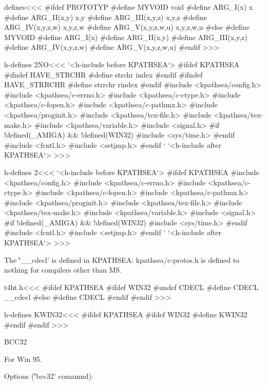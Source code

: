 {\<defines\><<<
#ifdef PROTOTYP
#define MYVOID void
#define ARG_I(x) x
#define ARG_II(x,y) x,y
#define ARG_III(x,y,z) x,y,z
#define ARG_IV(x,y,z,w) x,y,z,w
#define ARG_V(x,y,z,w,u) x,y,z,w,u
#else
#define MYVOID 
#define ARG_I(x) 
#define ARG_II(x,y) 
#define ARG_III(x,y,z) 
#define ARG_IV(x,y,z,w) 
#define ARG_V(x,y,z,w,u) 
#endif
>>>






\<h-defines 2NO\><<<
`<h-include before KPATHSEA`>
#ifdef KPATHSEA
#ifndef HAVE_STRCHR
#define  strchr  index
#endif
#ifndef HAVE_STRRCHR
#define  strrchr  rindex
#endif
#include <kpathsea/config.h>
#include <kpathsea/c-errno.h>
#include <kpathsea/c-ctype.h>
#include <kpathsea/c-fopen.h>
#include <kpathsea/c-pathmx.h>
#include <kpathsea/proginit.h>
#include <kpathsea/tex-file.h>
#include <kpathsea/tex-make.h>
#include <kpathsea/variable.h>
#include <signal.h>
#if !defined(_AMIGA) && !defined(WIN32)
#include <sys/time.h>
#endif
#include <fcntl.h>
#include <setjmp.h>
#endif `%
`<h-include after KPATHSEA`>
>>>

\<h-defines 2\><<<
`<h-include before KPATHSEA`>
#ifdef KPATHSEA
#include <kpathsea/config.h>
#include <kpathsea/c-errno.h>
#include <kpathsea/c-ctype.h>
#include <kpathsea/c-fopen.h>
#include <kpathsea/c-pathmx.h>
#include <kpathsea/proginit.h>
#include <kpathsea/tex-file.h>
#include <kpathsea/tex-make.h>
#include <kpathsea/variable.h>
#include <signal.h>
#if !defined(_AMIGA) && !defined(WIN32)
#include <sys/time.h>
#endif
#include <fcntl.h>
#include <setjmp.h>
#endif `%
`<h-include after KPATHSEA`>
>>>


The \`'__cdecl' is defined in KPATHSEA: kpathsea/c-protos.h 
is defined to nothing for compilers
other than MS.

\<t4ht.h\><<<
#ifdef KPATHSEA
#ifdef WIN32
#undef CDECL
#define CDECL                     __cdecl
#else
#define CDECL
#endif
#endif
>>>

\<h-defines KWIN32\><<<
#ifdef KPATHSEA
#ifdef WIN32
#define KWIN32  
#endif
#endif
>>>







\List{}
\item {BCC32}  

For Win 95.

Options (\''bcc32' comamnd):

}
